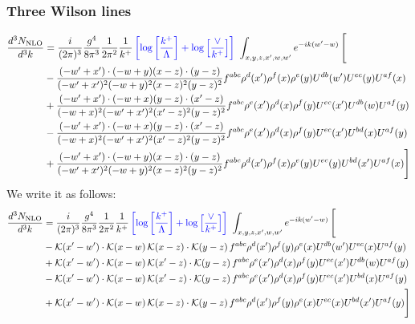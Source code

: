 \documentclass[aps,prd,amsmath,amssymb,nofootinbib]{revtex4-2}
\numberwithin{equation}{section}
\begin{document}
\subsubsection{Three Wilson lines}
\begin{align}
      \frac{d^{3}N_{\rm NLO}}{d^{3}k} & = \frac{i}{(2\pi)^{3}}\frac{g^{4}}{8\pi^{3}}\frac{1}{2\pi^{2}} \frac{1}{k^{+}}\,{\color{blue}\left[\log{\left[\frac{k^{+}}{\Lambda}\right]}+\log{\left[\frac{\vee}{k^{+}}\right]}\right]}\,\,\int_{x,y,z,x^{\prime},w,w^{\prime}}e^{-ik(w^{\prime}-w)}\, \Bigg[\notag \\ & -  \frac{( - w' + x') \cdot ( - w + y) (x - z) \cdot (y - z)}{( - w' + x')^{2} ( - w + y)^{2} (x - z)^{2} (y - z)^{2}} f^{a b c} \rho^{d}(x') \rho^{f}(x) \rho^{e}(y) U^{d b}(w') U^{e c}(y) U^{a f}(x)\nonumber\\
    &+  \frac{( - w' + x') \cdot ( - w + x) (y - z) \cdot (x' - z)}{( - w + x)^{2} ( - w' + x')^{2} (x' - z)^{2} (y - z)^{2}} f^{a b c} \rho^{e}(x') \rho^{d}(x) \rho^{f}(y) U^{e c}(x') U^{d b}(w) U^{a f}(y)\nonumber\\
    &- \frac{( - w' + x') \cdot ( - w + x) (y - z) \cdot (x' - z)}{( - w + x)^{2} ( - w' + x')^{2} (x' - z)^{2} (y - z)^{2}} f^{a b c} \rho^{e}(x') \rho^{d}(x) \rho^{f}(y) U^{e c}(x') U^{b d}(x) U^{a f}(y)\nonumber\\
    &+  \frac{( - w' + x') \cdot ( - w + y) (x - z) \cdot (y - z)}{( - w' + x')^{2} ( - w + y)^{2} (x - z)^{2} (y - z)^{2}} f^{a b c} \rho^{d}(x') \rho^{f}(x) \rho^{e}(y) U^{e c}(y) U^{b d}(x') U^{a f}(x) \Bigg]
\end{align}
We write it as follows:
\begin{align}
      \frac{d^{3}N_{\rm NLO}}{d^{3}k} & = \frac{i}{(2\pi)^{3}}\frac{g^{4}}{8\pi^{3}}\frac{1}{2\pi^{2}} \frac{1}{k^{+}}\,{\color{blue}\left[\log{\left[\frac{k^{+}}{\Lambda}\right]}+\log{\left[\frac{\vee}{k^{+}}\right]}\right]}\,\,\int_{x,y,z,x^{\prime},w,w^{\prime}}e^{-ik(w^{\prime}-w)}\, \Bigg[\notag \\ & - \mathcal{K}(x'-w')\cdot \mathcal{K}(x-w)\, \mathcal{K}(x-z)\cdot \mathcal{K}(y-z)\, f^{a b c} \rho^{d}(x') \rho^{f}(y) \rho^{e}(x) U^{d b}(w') U^{e c}(x) U^{a f}(y)\nonumber\\
    &+ \mathcal{K}(x'-w')\cdot \mathcal{K}(x-w)\,\mathcal{K}(x'-z)\cdot \mathcal{K}(y-z)\, f^{a b c} \rho^{e}(x') \rho^{d}(x) \rho^{f}(y) U^{e c}(x') U^{d b}(w) U^{a f}(y)\nonumber\\
    &- \mathcal{K}(x'-w')\cdot \mathcal{K}(x-w)\,\mathcal{K}(x'-z)\cdot \mathcal{K}(y-z)\, f^{a b c} \rho^{e}(x') \rho^{d}(x) \rho^{f}(y) U^{e c}(x') U^{b d}(x) U^{a f}(y)\nonumber\\
    &+  \mathcal{K}(x'-w')\cdot \mathcal{K}(x-w)\, \mathcal{K}(x-z)\cdot \mathcal{K}(y-z)\, f^{a b c} \rho^{d}(x') \rho^{f}(y) \rho^{e}(x) U^{e c}(x) U^{b d}(x') U^{a f}(y) \Bigg]
\end{align}
\end{document}
